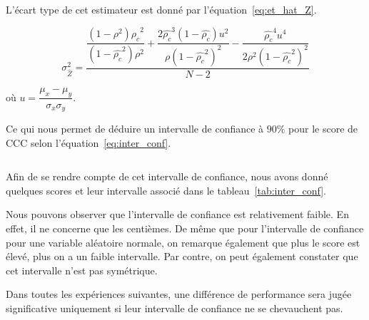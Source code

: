 L'écart type de cet estimateur est donné par l'équation~\ref{eq:et_hat_Z}.

\begin{equation}
\sigma_{\hat{Z} }^2 = \dfrac{\dfrac{(1-\rho^2) \hat{\rho_c} ^2}{(1-\hat{\rho_c}^2)\rho^2 } +  \dfrac{2\hat{\rho_c} ^3(1-\hat{\rho_c} )u^2}{\rho(1-\hat{\rho_c} ^2)^2} - \dfrac{\hat{\rho_c}^4 u^4}{2 \rho^2 (1-\hat{\rho_c}^2 )^2}}{N-2}
\label{eq:et_hat_Z}
\end{equation}

où $u = \dfrac{\mu_x - \mu_y}{\sigma_x \sigma_y}$.

Ce qui nous permet de déduire un intervalle de confiance à $90\%$ pour le score de CCC selon l'équation~\ref{eq:inter_conf}.

\begin{equation}
    [\tanh (\hat{Z} - 1.64 \sigma_{\hat{Z}}); \tanh(\hat{Z} + 1.64 \sigma_{\hat{Z}})]
    \label{eq:inter_conf}
\end{equation}

Afin de se rendre compte de cet intervalle de confiance, nous avons donné quelques scores et leur intervalle associé dans le tableau~\ref{tab:inter_conf}.



Nous pouvons observer que l'intervalle de confiance est relativement faible. En effet, il ne concerne que les centièmes. De même que pour l'intervalle de confiance pour une variable aléatoire normale, on remarque également que plus le score est élevé, plus on a un faible intervalle. Par contre, on peut également constater que cet intervalle n'est pas symétrique.

Dans toutes les expériences suivantes, une différence de performance sera jugée significative uniquement si leur intervalle de confiance ne se chevauchent pas.
